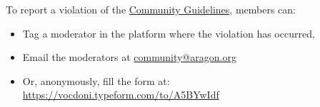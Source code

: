 To report a violation of the \hyperref[chap:CommunityGuidelines]{Community Guidelines}, members can:
\begin{itemize}
	\item Tag a moderator in the platform where the violation has occurred,
	\item Email the moderators at \href{community@aragon.org}{community@aragon.org}
	\item Or, anonymously, fill the form at: \href{https://vocdoni.typeform.com/to/A5BYwIdf}{https://vocdoni.typeform.com/to/A5BYwIdf}
\end{itemize}

